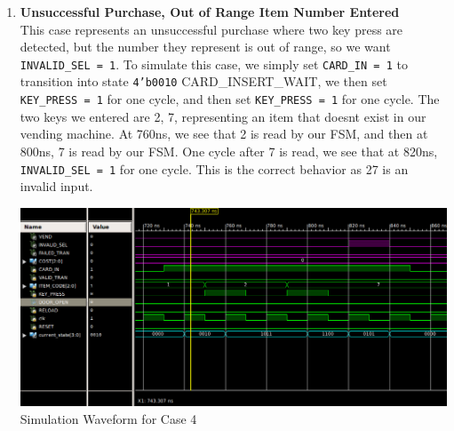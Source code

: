\documentclass{article}
\begin{document}
\begin{enumerate}
    \item \textbf{Unsuccessful Purchase, Out of Range Item Number Entered}  \\
    This case represents an unsuccessful purchase where two key press are detected, but the number they represent is out of range, so we want \texttt{INVALID\_SEL = 1}. To simulate this case, we simply set \texttt{CARD\_IN = 1} to transition into state \texttt{4'b0010} CARD\_INSERT\_WAIT, we then set \texttt{KEY\_PRESS = 1} for one cycle, and then set \texttt{KEY\_PRESS = 1} for one cycle. The two keys we entered are 2, 7, representing an item that doesnt exist in our vending machine. At 760ns, we see that 2 is read by our FSM, and then at 800ns, 7 is read by our FSM. One cycle after 7 is read, we see that at 820ns, \texttt{INVALID\_SEL = 1} for one cycle. This is the correct behavior as 27 is an invalid input.
    \begin{center}
        \includegraphics[scale=0.4]{waveform-4.png} \\
        \caption{Simulation Waveform for Case 4}
    \end{center}


\end{enumerate}
\end{document}
